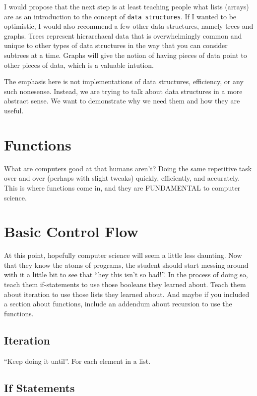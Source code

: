\documentclass[12pt]{article}
\begin{document}
      I would propose that the next step is at least teaching people what lists (arrays) are as an introduction to the concept of \texttt{data structures}. If I wanted to be optimistic, I would also recommend a few other data structures, namely trees and graphs. Trees represent hierarchacal data that is overwhelmingly common and unique to other types of data structures in the way that you can consider subtrees at a time. Graphs will give the notion of having pieces of data point to other pieces of data, which is a valuable intution.  

      The emphasis here is not implementations of data structures, efficiency, or any such nonesense. Instead, we are trying to talk about data structures in a more abstract sense. We want to demonstrate why we need them and how they are useful.

    \section{Functions}

      What are computers good at that humans aren't? Doing the same repetitive task over and over (perhaps with slight tweaks) quickly, efficiently, and accurately. This is where functions come in, and they are FUNDAMENTAL to computer science.  

    \section{Basic Control Flow}

      At this point, hopefully computer science will seem a little less daunting. Now that they know the atoms of programs, the student should start messing around with it a little bit to see that ``hey this isn't so bad!''. In the process of doing so, teach them if-statements to use those booleans they learned about. Teach them about iteration to use those lists they learned about. And maybe if you included a section about functions, include an addendum about recursion to use the functions. 

      \subsection{Iteration}

        ``Keep doing it until''. For each element in a list. 

      \subsection{If Statements}
\end{document}
